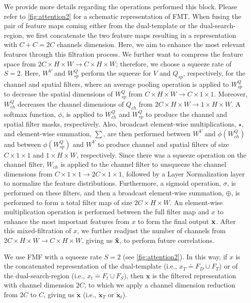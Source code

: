 We provide more details regarding the operations performed this block. Please refer to \ref{fig:attention2} for a schematic representation of FMT. When fusing the pair of feature maps coming either from the dual-template or the dual-search-region, we first concatenate the two feature maps resulting in a representation with $C+C=2C$ channels dimension. Here, we aim to enhance the most relevant features through this filtration process. We further want to compress the feature space from $2C \times H \times W \rightarrow C \times H \times W$; therefore, we choose a squeeze rate of $S = 2$. Here, $W^V$ and $W^Q_{sp}$ perform the squeeze for $V$ and $Q_{sp}$, respectively, for the channel and spatial filters, where an average pooling operation is applied to $W^Q_{sp}$ to decrease the spatial dimensions of $W^Q_{sp}$ from $C \times H \times W \rightarrow C \times 1 \times 1$.  Moreover, $W^Q_{ch}$ decreases the channel dimensions of $Q_{ch}$ from $2C \times H \times W \rightarrow 1 \times H \times W$. A softmax function, $\phi$, is applied to $W^Q_{ch}$ and $W^Q_{sp}$ to produce the channel and spatial filter masks, respectively. Also, broadcast element-wise multiplications, $\star$, and element-wise summation, $\sum$, are then performed between $W^V$ and $\phi(W^Q_{ch})$ and between $\phi (W^Q_{sp})$ and $W^V$ to produce channel and spatial filters of size $C \times 1 \times 1$ and $1 \times H \times W$, respectively. Since there was a squeeze operation on the channel filter, $W_{ch}$ is applied to the channel filter to unsqueeze the channel dimensions from $C \times 1 \times 1 \rightarrow 2C \times 1 \times 1$, followed by a Layer Normalization layer to normalize the feature distributions. Furthermore, a sigmoid operation, $\sigma$, is performed on these filters, and then a broadcast element-wise summation, $\oplus$, is performed to form a total filter map of size $2C \times H \times W$. An element-wise multiplication operation is performed between the full filter map and $x$ to enhance the most important features from $x$ to form the final output $\bold{x}$. After this mixed-filtration of $x$, we further readjust the number of channels from  $2C \times H \times W \rightarrow C \times H \times W$, giving us $\bold{\check{x} }$, to perform future correlations.

We use FMF with a squeeze rate $S=2$ (see \ref{fig:attention2}). In this way, if $x$ is the concatenated representation of the dual-template (i.e., $x_T \doteq F_D \cup F_T$) or of the dual-search-region (i.e., $x_t \doteq F_t \cup F_S$), then $\boldsymbol{x}$ is the filtered representation with channel dimension $2C$, to which we apply a channel dimension reduction from $2C$ to $C$, giving us $\boldsymbol{\check{x}}$ (i.e., $\boldsymbol{\check{x}}_T$ or $\boldsymbol{\check{x}}_t$).



